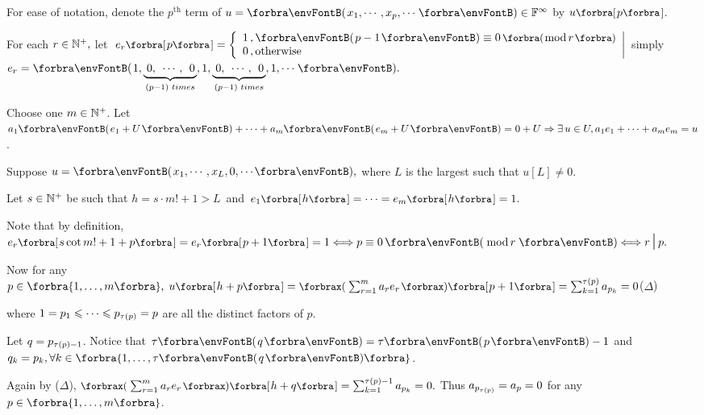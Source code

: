 \documentclass[a4paper, 11pt, UTF8]{article}
\begin{document}
\begin{large}
For ease of notation, denote the $p^\text{th}$ term of $u=\Par{x_1,\cdots,x_p,\cdots}\in\Fbb^{\infty}$ by $u\Sbra{p}$.\vspace{6pt}\par\quad
For each $r\in{\mathbb{N}^+},$ let $\;e_r\Sbra{p}=\hMath[0pt]{l}{\left\{}{\right|}{1\,,\Par{p-1}\equiv 0\,\BigPar{\text{mod}\,r}\\0\,,\text{otherwise}}$ \;\;simply $e_r=\Par{1,\underbrace{\;0,\;\,\cdots,\;\,0\,}_{\SmallPar{p-1}\,\,times},1,\underbrace{\;0,\;\,\cdots,\;\,0\,}_{\SmallPar{p-1}\,\,times},1,\cdots}.$\vspace{6pt}\par\quad
Choose one $m\in{\mathbb{N}^+}$. Let $a_1\Par{e_1+U}+\dots+a_m\Par{e_m+U}=0+U\Rightarrow\exists\,u\in U,a_1 e_1+\dots+a_m e_m=u$.\vspace{4pt}\par\quad
Suppose $u=\Par{x_1,\cdots,x_L,{0,\cdots}},$ where $L$ is the largest such that $u[L]\neq 0.$\vspace{4pt}\par\quad
Let $s\in{\mathbb{N}^+}$ be such that $h=s\cdot m!+1> L$\, and \,$e_1\Sbra{h}=\cdots=e_m\Sbra{h}=1.$\vspace{6pt}\par\quad
Note that by definition, \;$e_r\Sbra{s\cot m!+1+p}=e_r\Sbra{p+1}=1\Longleftrightarrow p\equiv 0\,\Par{\,\text{mod}\,r\,}\Longleftrightarrow r\,\mid\,p.$\vspace{6pt}\par\quad
Now for any $p\in\Bra{1,\dots,m},\;u\Sbra{h+p}=\XPar{\sum_{r=1}^m a_r e_r}\Sbra{p+1}=\sum_{k=1}^{\tau\SmallPar{p}}a_{p_k}=0$\hfill(${\Delta}$)\vspace{6pt}\par\quad
where $1=p_1\leqslant\cdots\leqslant p_{\tau\text{(}p\text{)}}=p$ are all the distinct factors of $p.$\vspace{4pt}\par\quad
Let $q=p_{\tau\text{(}p\text{)}-1}$. Notice that $\tau\Par{q}=\tau\Par{p}-1$ and $q_k=p_k,\forall k\in\Bra{1,\dots,\tau\Par{q}}$.\par\vspace{6pt}\quad
Again by ($\Delta$), $\XPar{\sum_{r=1}^m a_r e_r}\Sbra{h+q}=\sum_{k=1}^{\tau\SmallPar{p}-1}a_{p_k}=0.$ Thus $a_{p_{\tau\text{(}p\text{)}}}=a_p=0$ for any $p\in\Bra{1,\dots,m}$.\vspace{8pt}\par\quad

\end{large}
\end{document}
